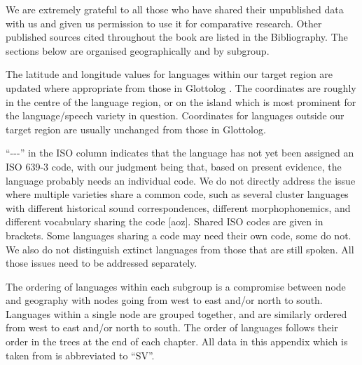We are extremely grateful to all those who have shared their
unpublished data with us
and given us permission to use it for comparative research.
Other published sources cited throughout the book are listed in the Bibliography.
The sections below are organised geographically and by subgroup.

The latitude and longitude values for languages within our target
region are updated where appropriate from those in Glottolog
\citep{Hammarstrom2023}.
The coordinates are roughly in the centre of the language region,
or on the island which is most prominent for the language/speech variety in question.
Coordinates for languages outside our target region are usually
unchanged from those in Glottolog.

“{-}{-}{-}” in the ISO column indicates that the language has
not yet been assigned an ISO 639-3 code,
with our judgment being that,
based on present evidence,
the language probably needs an individual code.
We do not directly address the issue where multiple varieties
share a common code,
such as several  cluster languages with different historical
sound correspondences, different morphophonemics,
and different vocabulary sharing the code [aoz].
Shared ISO codes are given in brackets.
Some languages sharing a code may need their own code, some do not.
We also do not distinguish extinct languages from those that are still spoken.
All those issues need to be addressed separately.

The ordering of languages within each subgroup is a compromise
between node and geography with nodes going from west to east and/or north to south.
Languages within a single node are grouped together,
and are similarly ordered from west to east and/or north to south.
The order of languages follows their order in the trees at the
end of each chapter.
All data in this appendix which is taken from 
\citet{SmitsVoorhoeve1992a,SmitsVoorhoeve1992b,
SmitsVoorhoeve1994,SmitsVoorhoeve1998} is abbreviated to “SV”.












	
	
	
	
	
	


	
	
	